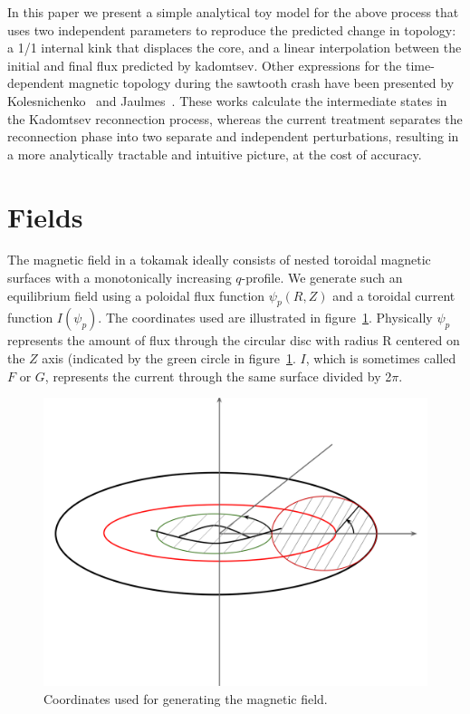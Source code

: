 \documentclass[%
superscriptaddress,
amsmath,amssymb,
aps,
pre,
floatfix,
]{revtex4-2}
\begin{document}
In this paper we present a simple analytical toy model for the above process that uses two independent parameters to reproduce the predicted change in topology: a 1/1 internal kink that displaces the core, and a linear interpolation between the initial and final flux predicted by kadomtsev.
Other expressions for the time-dependent magnetic topology during the sawtooth crash have been presented by Kolesnichenko~\cite{kolesnichenko1996theory} and Jaulmes~\cite{jaulmes2014redistribution}.
These works calculate the intermediate states in the Kadomtsev reconnection process, whereas the current treatment separates the reconnection phase into two separate and independent perturbations, resulting in a more analytically tractable and intuitive picture, at the cost of accuracy.

\section*{Fields}
The magnetic field in a tokamak ideally consists of nested toroidal magnetic surfaces with a monotonically increasing $q$-profile.
We generate such an equilibrium field using a poloidal flux function $\psi_p(R, Z)$ and a toroidal current function $I(\psi_p)$.
The coordinates used are illustrated in figure~\ref{fig:coords}.
Physically $\psi_p$ represents the amount of flux through the circular disc with radius R centered on the $Z$ axis (indicated by the green circle in figure~\ref{fig:coords}.
$I$, which is sometimes called $F$ or $G$, represents the current through the same surface divided by 2$\pi$.
\begin{figure}\label{fig:coords}
  \includegraphics{fig/torus.png}
  \caption{Coordinates used for generating the magnetic field. }
\end{figure}
\end{document}
